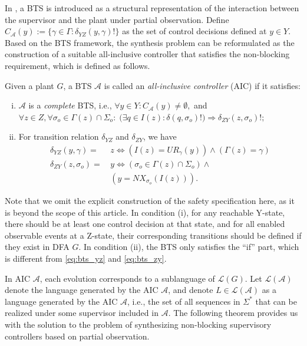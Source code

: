 \documentclass[journal,twoside,web]{ieeecolor}
\begin{document}
In \cite{yin2016synthesis}, a BTS is introduced as a structural representation of the interaction between the supervisor and the plant under partial observation. 
Define $C_{\mathcal{A}}(y) := \{ \gamma \in \Gamma : \delta_{YZ}(y, \gamma)! \}$ as the set of control decisions defined at $y \in Y$.
Based on the BTS framework, the synthesis problem can be reformulated as the construction of a suitable all-inclusive controller that satisfies the non-blocking requirement, which is defined as follows.
%
\begin{definition}
Given a plant $G$, a BTS $\mathcal{A}$ is called an \emph{all-inclusive controller} (AIC) if it satisfies:
\begin{enumerate}[(i)]
    \item $\mathcal{A}$ is a \emph{complete} BTS, i.e.,
    $
    \forall y \in Y : C_{\mathcal{A}}(y) \neq \emptyset,
    $
    and
    $
    \forall z \in Z, \forall \sigma_o \in \Gamma(z)\cap\Sigma_o:\;
    \big(\exists q \in I(z): \delta(q,\sigma_o)!\big) \Rightarrow \delta_{ZY}(z, \sigma_o)!;
    $
    \item For transition relation $\delta_{YZ}$ and $\delta_{ZY}$, we have
    $$
    \begin{aligned}
        \delta_{YZ}(y, \gamma)   = \, &z \Leftrightarrow (I(z) = UR_{\gamma}(y)) \wedge (\Gamma(z) = \gamma) \\
        \delta_{ZY}(z, \sigma_o) = \, &y \Leftrightarrow (\sigma_o \in \Gamma(z) \cap \Sigma_o) \wedge \\
                                      &(y = NX_{\sigma_o}(I(z))).
    \end{aligned}
    $$
\end{enumerate}
\label{def:aic}
\end{definition}
%
Note that we omit the explicit construction of the safety specification here, as it is beyond the scope of this article.
In condition (i), for any reachable Y-state, there should be at least one control decision at that state, and for all enabled observable events at a Z-state, their corresponding transitions should be defined if they exist in DFA $G$.
In condition (ii), the BTS only satisfies the ``if'' part, which is different from \eqref{eq:bts_yz} and \eqref{eq:bts_zy}.

In AIC $\mathcal{A}$, each evolution corresponds to a sublanguage of $\mathcal{L}(G)$.
Let $\mathcal{L}(\mathcal{A})$ denote the language generated by the AIC $\mathcal{A}$, and denote $L \in \mathcal{L}(\mathcal{A})$ as a language generated by the AIC $\mathcal{A}$, 
i.e., the set of all sequences in $\Sigma^*$ that can be realized under some supervisor included in $\mathcal{A}$.
%
The following theorem provides us with the solution to the problem of synthesizing non-blocking supervisory controllers based on partial observation.
\end{document}
